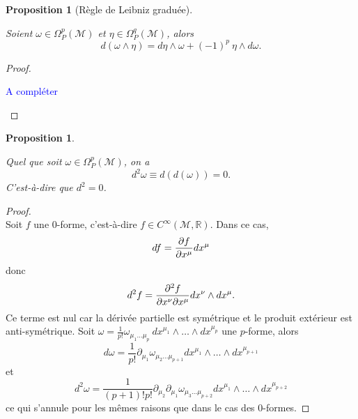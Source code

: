 \documentclass[a4paper,11pt]{report}
\theoremstyle{definition}
\theoremstyle{plain}
\newtheorem{prop}[thm]{Proposition}
\theoremstyle{definition}
\theoremstyle{remark}
\newcommand{\comp}{\begin{center}\textcolor{blue}{A compléter}\end{center}}
\newcommand{\M}{\mathscr{M}}
\newcommand{\p}{\partial}
\begin{document}
            \begin{prop}[Règle de Leibniz graduée]\begin{leftbar}
                Soient $\omega\in\Omega_P^p(\M)$ et $\eta\in\Omega_P^q(\M)$, alors
                \begin{equation}
                    d(\omega\wedge\eta) = d\eta\wedge\omega+(-1)^{p}~\eta\wedge d\omega.
                \end{equation}
            \end{leftbar}\end{prop}
            
            \begin{proof}${}$\\
                \comp
            \end{proof}
            
            \begin{prop}\begin{leftbar}
                Quel que soit $\omega\in\Omega_P^p(\M)$, on a 
                \begin{equation}
                    d^2\omega \equiv d(d(\omega)) = 0.
                \end{equation}
                C'est-à-dire que $d^2 = 0$.
            \end{leftbar}\end{prop}
            
            \begin{proof}${}$\\
                Soit $f$ une $0$-forme, c'est-à-dire $f\in C^\infty(\M,\mathbb{R})$. Dans ce cas,
                \begin{equation}
                    df = \pdv{f}{x^\mu}dx^\mu
                \end{equation}
                donc
                \begin{equation}
                    d^2f = \pdv{f}{x^\nu}{x^\mu}dx^\nu\wedge dx^\mu.
                \end{equation}
                Ce terme est nul car la dérivée partielle est symétrique et le produit extérieur est anti-symétrique. Soit $\omega = \frac{1}{p!}\omega_{\mu_1\dots\mu_p}~dx^{\mu_1}\wedge \dots\wedge dx^{\mu_p}$ une $p$-forme, alors
                \begin{equation}
                    d\omega = \frac{1}{p!}\p_{\mu_1}\omega_{\mu_2\dots\mu_{p+1}} dx^{\mu_1}\wedge \dots\wedge dx^{\mu_{p+1}}
                \end{equation}
                et
                \begin{equation}
                    d^2\omega = \frac{1}{(p+1)!p!}\p_{\mu_2}\p_{\mu_1}\omega_{\mu_3\dots\mu_{p+2}} dx^{\mu_1}\wedge \dots\wedge dx^{\mu_{p+2}}
                \end{equation}
                ce qui s'annule pour les mêmes raisons que dans le cas des $0$-formes.
            \end{proof}
            
\end{document}
